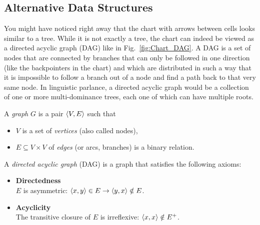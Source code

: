 \subsection{Alternative Data Structures}
You might have noticed right away that the chart with arrows between cells looks similar to a tree.
While it is not exactly a tree, the chart can indeed be viewed as a directed acyclic graph (DAG) like in Fig.~\ref{fig:Chart_DAG}.
A DAG is a set of nodes that are connected by branches that can only be followed in one direction (like the backpointers in the chart) and which are distributed in such a way that it is impossible to follow a branch out of a node and find a path back to that very same node.
In linguistic parlance, a directed acyclic graph would be a collection of one or more multi-dominance trees, each one of which can have multiple roots.
%
\begin{definition}[DAG]
    A \emph{graph} $G$ is a pair $\left \langle V,E \right \rangle $ such that
    \begin{itemize}
        \item $V$ is a set of \emph{vertices} (also called nodes),
        \item $E \subseteq V \times V$ of \emph{edges} (or arcs, branches) is a binary relation.
    \end{itemize}
    A \emph{directed acyclic graph} (DAG) is a graph that satisfies the following axioms:
    \begin{itemize}
        \item \textbf{Directedness}\\
            $E$ is asymmetric: $\left \langle x,y \right \rangle  \in E \rightarrow \left \langle y,x \right \rangle  \notin E$.
        \item \textbf{Acyclicity}\\
            The transitive closure of $E$ is irreflexive: $\left \langle x,x \right \rangle  \notin E^+$.
    \end{itemize}
\end{definition}
%
